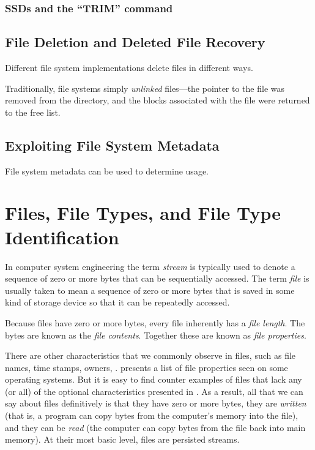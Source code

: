 \documentclass[11pt,letter]{article}
\begin{document}
\subsection{SSDs and the ``TRIM'' command}
\cite{dfrws2011:TimothyVidasAndChengyeZhangAndNicolasChristin}


\section{File Deletion and Deleted File Recovery}\label{deleted_file_recovery}
Different file system implementations delete files in different ways.

Traditionally, file systems simply \emph{unlinked} files---the pointer
to the file was removed from the directory, and the blocks associated
with the file were returned to the free list.


\section{Exploiting File System Metadata}
File system metadata can be used to determine usage. 
\cite{dfrws2011:JonathanGrier}

\chapter{Files, File Types, and File Type Identification}

In computer system engineering the term \emph{stream} is typically
used to denote a sequence of zero or more bytes that can be
sequentially accessed. The term \emph{file} is usually taken to mean a
sequence of zero or more bytes that is saved in some kind of storage
device so that it can be repeatedly accessed. 

Because files have zero or more bytes, every file inherently has a
\emph{file length}. The bytes are known as the \emph{file contents}. Together these are known as \emph{file
  properties}. 

There are other characteristics that we
commonly observe in files, such as file names, time stamps, owners,
\etc.   presents a list of file
properties seen on some operating systems. But it is easy to find counter examples of files that lack any
(or all) of the optional characteristics presented in
. As a result, all that we
can say about files definitively is that they have zero or more bytes,
they are \emph{written} (that is, a program can copy bytes from
the computer's memory into the file), and they can be \emph{read}
(the computer can copy bytes from the file back into main memory). At
their most basic level, files are persisted streams. 
\end{document}
